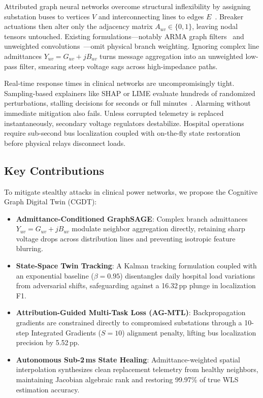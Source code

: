 \documentclass[runningheads]{llncs}
\begin{document}
Attributed graph neural networks overcome structural inflexibility by assigning substation buses to vertices $V$ and interconnecting lines to edges $E$~\cite{sweeten2025cyber}.
Breaker actuations then alter only the adjacency matrix $A_{uv} \in \{0,1\}$, leaving nodal tensors untouched.
Existing formulations---notably ARMA graph filters~\cite{boyaci2022joint} and unweighted convolutions~\cite{takiddin2023generalized}---omit physical branch weighting.
Ignoring complex line admittances $Y_{uv} = G_{uv} + jB_{uv}$ turns message aggregation into an unweighted low-pass filter, smearing steep voltage sags across high-impedance paths.

Real-time response times in clinical networks are uncompromisingly tight.
Sampling-based explainers like SHAP or LIME evaluate hundreds of randomized perturbations, stalling decisions for seconds or full minutes~\cite{yuan2023explainability}.
Alarming without immediate mitigation also fails.
Unless corrupted telemetry is replaced instantaneously, secondary voltage regulators destabilize.
Hospital operations require sub-second bus localization coupled with on-the-fly state restoration before physical relays disconnect loads.

\subsection{Key Contributions}

To mitigate stealthy attacks in clinical power networks, we propose the Cognitive Graph Digital Twin (CGDT):
\begin{itemize}
\item \textbf{Admittance-Conditioned GraphSAGE}: Complex branch admittances $Y_{uv} = G_{uv} + jB_{uv}$ modulate neighbor aggregation directly, retaining sharp voltage drops across distribution lines and preventing isotropic feature blurring.
\item \textbf{State-Space Twin Tracking}: A Kalman tracking formulation coupled with an exponential baseline ($\beta = 0.95$) disentangles daily hospital load variations from adversarial shifts, safeguarding against a 16.32\,pp plunge in localization F1.
\item \textbf{Attribution-Guided Multi-Task Loss (AG-MTL)}: Backpropagation gradients are constrained directly to compromised substations through a 10-step Integrated Gradients ($S=10$) alignment penalty, lifting bus localization precision by 5.52\,pp.
\item \textbf{Autonomous Sub-2\,ms State Healing}: Admittance-weighted spatial interpolation synthesizes clean replacement telemetry from healthy neighbors, maintaining Jacobian algebraic rank and restoring 99.97\% of true WLS estimation accuracy.
\end{itemize}
\end{document}
